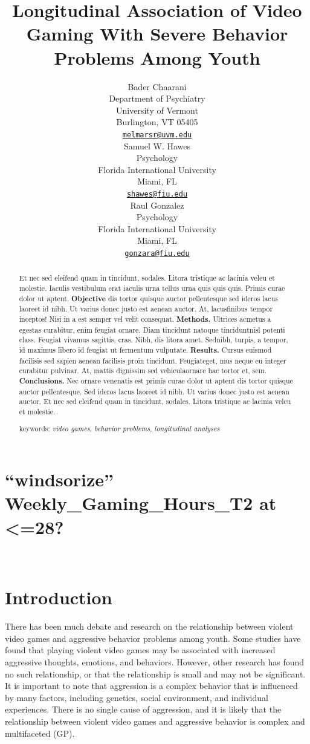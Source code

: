 \documentclass{article}
\title{Longitudinal Association of Video Gaming With Severe Behavior
Problems Among Youth}
\author{
    Bader Chaarani
   \\
    Department of Psychiatry \\
    University of Vermont \\
  Burlington, VT 05405 \\
  \texttt{\href{mailto:melmarsr@uvm.edu}{\nolinkurl{melmarsr@uvm.edu}}} \\
   \And
    Samuel W. Hawes
   \\
    Psychology \\
    Florida International University \\
  Miami, FL \\
  \texttt{\href{mailto:shawes@fiu.edu}{\nolinkurl{shawes@fiu.edu}}} \\
   \And
    Raul Gonzalez
   \\
    Psychology \\
    Florida International University \\
  Miami, FL \\
  \texttt{\href{mailto:gonzara@fiu.edu}{\nolinkurl{gonzara@fiu.edu}}} \\
  }
\begin{document}
\maketitle


\begin{abstract}
Et nec sed eleifend quam in tincidunt, sodales. Litora tristique ac
lacinia veleu et molestie. Iaculis vestibulum erat iaculis urna tellus
urna quis quis quis. Primis curae dolor ut aptent. \textbf{Objective}
dis tortor quisque auctor pellentesque sed ideros lacus laoreet id nibh.
Ut varius donec justo est aenean auctor. At, lacusfinibus tempor
inceptos! Nisi in a est semper vel velit consequat. \textbf{Methods.}
Ultrices acmetus a egestas curabitur, enim feugiat ornare. Diam
tincidunt natoque tinciduntnisl potenti class. Feugiat vivamus sagittis,
cras. Nibh, dis litora amet. Sednibh, turpis, a tempor, id maximus
libero id feugiat ut fermentum vulputate. \textbf{Results.} Cursus
euismod facilisis sed sapien aenean facilisis proin tincidunt.
Feugiateget, mus neque eu integer curabitur pulvinar. At, mattis
dignissim sed vehiculaornare hac tortor et, sem. \textbf{Conclusions.}
Nec ornare venenatis est primis curae dolor ut aptent dis tortor quisque
auctor pellentesque. Sed ideros lacus laoreet id nibh. Ut varius donec
justo est aenean auctor. Et nec sed eleifend quam in tincidunt, sodales.
Litora tristique ac lacinia veleu et molestie.

keywords: \emph{video games}, \emph{behavior problems},
\emph{longitudinal analyses}
\end{abstract}


\hypertarget{windsorize-weekly_gaming_hours_t2-at-28}{%
\section{``windsorize'' Weekly\_Gaming\_Hours\_T2 at
\textless=28?}\label{windsorize-weekly_gaming_hours_t2-at-28}}

~ ~

\hypertarget{introduction}{%
\section{Introduction}\label{introduction}}

There has been much debate and research on the relationship between
violent video games and aggressive behavior problems among youth. Some
studies have found that playing violent video games may be associated
with increased aggressive thoughts, emotions, and behaviors. However,
other research has found no such relationship, or that the relationship
is small and may not be significant. It is important to note that
aggression is a complex behavior that is influenced by many factors,
including genetics, social environment, and individual experiences.
There is no single cause of aggression, and it is likely that the
relationship between violent video games and aggressive behavior is
complex and multifaceted (GP).
\end{document}
